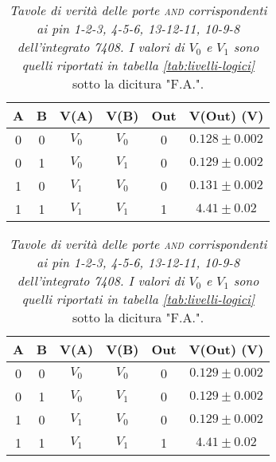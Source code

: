 \begin{table}[H]
  \vspace{.5mm}

  \begin{subtable}[H]{0.5\textwidth}
    \centering
    \begin{tabular}[t]{c  c | c  c | c  c}
      \hline
      A & B & V(A) & V(B) & Out & V(Out) (V)\\
      \hline
      0 & 0 & $V_{0}$ & $V_{0}$ & 0 & $0.128 \pm 0.002$ \\
      0 & 1 & $V_{0}$ & $V_{1}$ & 0 & $0.129 \pm 0.002$ \\
      1 & 0 & $V_{1}$ & $V_{0}$ & 0 & $0.131 \pm 0.002$ \\
      1 & 1 & $V_{1}$ & $V_{1}$ & 1 & $4.41 \pm 0.02$ \\
      \hline
    \end{tabular}
  \end{subtable}

  \vspace{.5cm}

  \begin{subtable}[H]{0.5\textwidth}
    \centering
    \begin{tabular}[t]{c  c | c  c | c  c}
      \hline
      A & B & V(A) & V(B) & Out & V(Out) (V)\\
      \hline
      0 & 0 & $V_{0}$ & $V_{0}$ & 0 & $0.129 \pm 0.002$ \\
      0 & 1 & $V_{0}$ & $V_{1}$ & 0 & $0.129 \pm 0.002$ \\
      1 & 0 & $V_{1}$ & $V_{0}$ & 0 & $0.129 \pm 0.002$ \\
      1 & 1 & $V_{1}$ & $V_{1}$ & 1 & $4.41 \pm 0.02$ \\
      \hline
    \end{tabular}
  \end{subtable}
  \caption{\emph{Tavole di verità delle porte \textsc{and} corrispondenti ai pin 1-2-3, 4-5-6, 13-12-11, 10-9-8 dell'integrato 7408. I valori di $V_{0}$ e $V_{1}$ sono quelli riportati in tabella \ref{tab:livelli-logici}} sotto la dicitura "F.A.".}
  \label{tab:and1-multiplexer}
\end{table}

